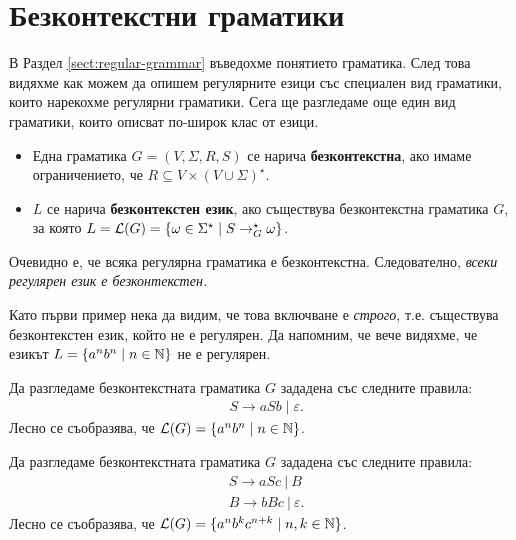 \section{Безконтекстни граматики}


В Раздел \ref{sect:regular-grammar} въведохме понятието граматика. След това видяхме как можем да опишем регулярните езици
със специален вид граматики, които нарекохме регулярни граматики.
Сега ще разгледаме още един вид граматики, които описват по-широк клас от езици.

\begin{itemize}
\item 
  Една граматика $G = (V, \Sigma, R, S)$ се нарича {\bf безконтекстна}, ако 
  имаме ограничението, че $R \subseteq V\times (V\cup\Sigma)^\star$.
\item
  $L$ се нарича {\bf безконтекстен език}, ако съществува безконтекстна граматика $G$, за която 
  $L = \mathcal{L}(G) = \{\omega \in \Sigma^\star \mid S \to^\star_G \omega\}$.
\end{itemize}

\begin{remark}
  Очевидно е, че всяка регулярна граматика е безконтекстна. Следователно, 
  {\em всеки регулярен език е безконтекстен.}
\end{remark}

Като първи пример нека да видим, че това включване е {\em строго}, т.е. съществува безконтекстен език, който не е регулярен.
Да напомним, че вече видяхме, че езикът $L = \{a^nb^n \mid n\in\mathbb{N}\}$ не е регулярен.

\begin{example}
  Да разгледаме безконтекстната граматика $G$ зададена със следните правила:
  \begin{align*}
    & S \to aSb \mid \varepsilon.
  \end{align*}
  Лесно се съобразява, че $\mathcal{L}(G) = \{a^nb^n \mid n\in\mathbb{N}\}$.
\end{example}

\begin{example}
  Да разгледаме безконтекстната граматика $G$ зададена със следните правила:
  \begin{align*}
    & S \to aSc\ |\  B\\
    & B \to bBc\ |\ \varepsilon.
  \end{align*}
  Лесно се съобразява, че $\mathcal{L}(G) = \{a^nb^kc^{n+k} \mid n,k\in\mathbb{N}\}$.
\end{example}

